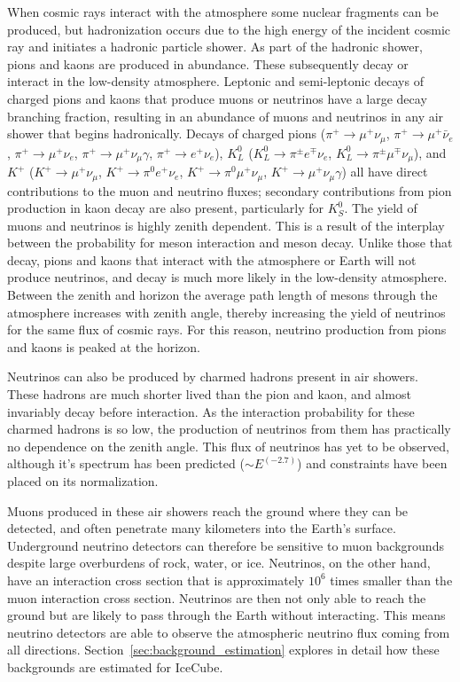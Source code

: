 When cosmic rays interact with the atmosphere some nuclear fragments can be produced, but hadronization occurs due to the high energy of the incident cosmic ray and initiates a hadronic particle shower.
As part of the hadronic shower, pions and kaons are produced in abundance.
These subsequently decay or interact in the low-density atmosphere.
Leptonic and semi-leptonic decays of charged pions and kaons that produce muons or neutrinos have a large decay branching fraction, resulting in an abundance of muons and neutrinos in any air shower that begins hadronically.
Decays of charged pions ($\pi^+\rightarrow\mu^+\nu_\mu$, $\pi^+\rightarrow\mu^+\bar{\nu}_e$, $\pi^+\rightarrow\mu^+\nu_e$, $\pi^+\rightarrow\mu^+\nu_\mu \gamma$, $\pi^+\rightarrow e^+\nu_e$), $K_L^0$ ($K_L^0 \rightarrow \pi^\pm e^\mp \nu_e$, $K_L^0 \rightarrow \pi^\pm \mu^\mp \nu_\mu$), and $K^+$ ($K^+\rightarrow \mu^+ \nu_\mu$, $K^+\rightarrow \pi^0 e^+ \nu_e$, $K^+\rightarrow \pi^0 \mu^+ \nu_\mu$, $K^+\rightarrow \mu^+ \nu_\mu \gamma$) all have direct contributions to the muon and neutrino fluxes; secondary contributions from pion production in kaon decay are also present, particularly for $K_S^0$.
The yield of muons and neutrinos is highly zenith dependent.
This is a result of the interplay between the probability for meson interaction and meson decay.
Unlike those that decay, pions and kaons that interact with the atmosphere or Earth will not produce neutrinos, and decay is much more likely in the low-density atmosphere.
Between the zenith and horizon the average path length of mesons through the atmosphere increases with zenith angle, thereby increasing the yield of neutrinos for the same flux of cosmic rays.
For this reason, neutrino production from pions and kaons is peaked at the horizon.

Neutrinos can also be produced by charmed hadrons present in air showers.
These hadrons are much shorter lived than the pion and kaon, and almost invariably decay before interaction.
As the interaction probability for these charmed hadrons is so low, the production of neutrinos from them has practically no dependence on the zenith angle.
This flux of neutrinos has yet to be observed, although it's spectrum has been predicted ($\sim E^(-2.7)$) and constraints have been placed on its normalization.

Muons produced in these air showers reach the ground where they can be detected, and often penetrate many kilometers into the Earth's surface.
Underground neutrino detectors can therefore be sensitive to muon backgrounds despite large overburdens of rock, water, or ice.
Neutrinos, on the other hand, have an interaction cross section that is approximately $10^6$ times smaller than the muon interaction cross section.
Neutrinos are then not only able to reach the ground but are likely to pass through the Earth without interacting.
This means neutrino detectors are able to observe the atmospheric neutrino flux coming from all directions.
Section~\ref{sec:background_estimation} explores in detail how these backgrounds are estimated for IceCube.

